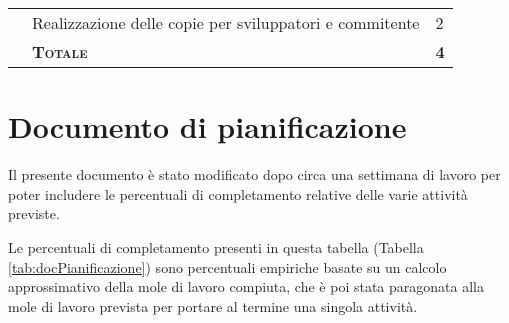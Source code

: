 \begin{tabularx}{\textwidth}{|m{5cm}|X|M{2cm}|}
	                                                                          & Realizzazione delle copie per sviluppatori e commitente        & 2                                                        \\  
	                                  & \textbf{\textsc{Totale}}                                     & \textbf{4}                                               \\ \hline
\end{tabularx}

\section{Documento di pianificazione}
Il presente documento è stato modificato dopo circa una settimana di lavoro per poter includere le percentuali di completamento relative delle varie attività previste.

Le percentuali di completamento presenti in questa tabella (Tabella \ref{tab:docPianificazione}) sono percentuali empiriche basate su un calcolo approssimativo della mole di lavoro compiuta, che è poi stata paragonata alla mole di lavoro prevista per portare al termine una singola attività.
 
